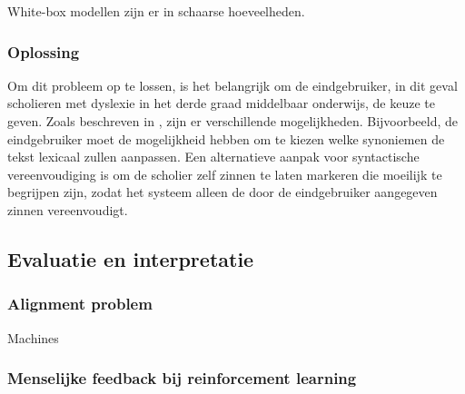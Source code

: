 White-box modellen zijn er in schaarse hoeveelheden. 


\subsubsection{Oplossing}

Om dit probleem op te lossen, is het belangrijk om de eindgebruiker, in dit geval scholieren met dyslexie in het derde graad middelbaar onderwijs, de keuze te geven. Zoals beschreven in \textcite{Gooding2022}, zijn er verschillende mogelijkheden. Bijvoorbeeld, de eindgebruiker moet de mogelijkheid hebben om te kiezen welke synoniemen de tekst lexicaal zullen aanpassen. Een alternatieve aanpak voor syntactische vereenvoudiging is om de scholier zelf zinnen te laten markeren die moeilijk te begrijpen zijn, zodat het systeem alleen de door de eindgebruiker aangegeven zinnen vereenvoudigt.

\subsection{Evaluatie en interpretatie}

\subsubsection{Alignment problem}

Machines 


\subsubsection{Menselijke feedback bij reinforcement learning}

